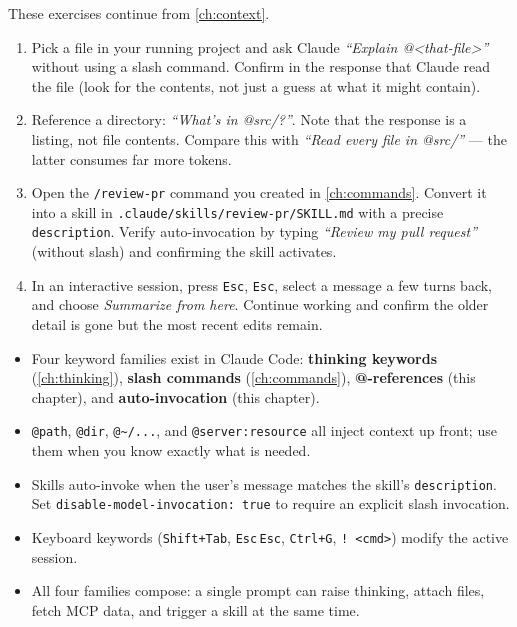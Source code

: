 \begin{exercisebox}
These exercises continue from \cref{ch:context}.

\begin{enumerate}
  \item Pick a file in your running project and ask Claude
        \emph{``Explain @<that-file>''} without using a slash command.
        Confirm in the response that Claude read the file (look for the
        contents, not just a guess at what it might contain).
  \item Reference a directory: \emph{``What's in @src/?''}. Note that
        the response is a listing, not file contents. Compare this with
        \emph{``Read every file in @src/''} — the latter consumes far
        more tokens.
  \item Open the \texttt{/review-pr} command you created in
        \cref{ch:commands}. Convert it into a skill in
        \texttt{.claude/skills/review-pr/SKILL.md} with a precise
        \texttt{description}. Verify auto-invocation by typing
        \emph{``Review my pull request''} (without slash) and
        confirming the skill activates.
  \item In an interactive session, press \texttt{Esc}, \texttt{Esc},
        select a message a few turns back, and choose \emph{Summarize
        from here}. Continue working and confirm the older detail is
        gone but the most recent edits remain.
\end{enumerate}
\end{exercisebox}

\begin{summarybox}
\begin{itemize}
  \item Four keyword families exist in Claude Code:
        \textbf{thinking keywords} (\cref{ch:thinking}),
        \textbf{slash commands} (\cref{ch:commands}),
        \textbf{@-references} (this chapter), and
        \textbf{auto-invocation} (this chapter).
  \item \texttt{@path}, \texttt{@dir}, \texttt{@\textasciitilde/...}, and
        \texttt{@server:resource} all inject context up front; use them
        when you know exactly what is needed.
  \item Skills auto-invoke when the user's message matches the skill's
        \texttt{description}. Set \texttt{disable-model-invocation: true}
        to require an explicit slash invocation.
  \item Keyboard keywords (\texttt{Shift+Tab}, \texttt{Esc}\,\texttt{Esc},
        \texttt{Ctrl+G}, \texttt{!\,<cmd>}) modify the active session.
  \item All four families compose: a single prompt can raise thinking,
        attach files, fetch MCP data, and trigger a skill at the same
        time.
\end{itemize}
\end{summarybox}

\nocite{*}
\printbibliography[heading=subbibliography,title={References}]
